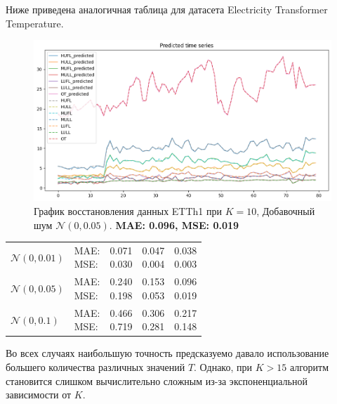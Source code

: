 \documentclass{article}
\begin{document}
Ниже приведена аналогичная таблица для датасета Electricity Transformer Temperature.

\begin{figure}[H]
	\centering
	\includegraphics[width=\textwidth]{K10N005_electicity.png}
	\caption{График восстановления данных ETTh1 при $K=10$, Добавочный шум $\mathcal{N}(0, 0.05)$. \textbf{MAE: 0.096, MSE: 0.019}}
	\label{fig:fig7}
\end{figure}

\def\arraystretch{2.3}
\begin{tabular}{|l||l||*{3}{c|}}\hline
	\backslashbox{Шум}{Параметры}
	&\makebox[3em]{Метрика}&\makebox[3em]{$K=2$}&\makebox[3em]{$K=4$}&\makebox[3em]{$K=10$}\\\hline
	$\mathcal{N}(0, 0.01)$&\makecell{ MAE: \\ MSE: } &\makecell{ 0.071 \\ 0.030 }&\makecell{ 0.047 \\ 0.004 }&\makecell{ 0.038 \\ 0.003 }\\\hline
	$\mathcal{N}(0, 0.05)$&\makecell{ MAE: \\ MSE: } &\makecell{ 0.240 \\ 0.198 }&\makecell{ 0.153 \\ 0.053 }&\makecell{ 0.096 \\ 0.019 }\\\hline
	$\mathcal{N}(0, 0.1)$& \makecell{ MAE: \\ MSE: } &\makecell{ 0.466 \\ 0.719 }&\makecell{ 0.306 \\ 0.281 }&\makecell{ 0.217 \\ 0.148 }\\\hline
\end{tabular}


Во всех случаях наибольшую точность предсказуемо давало использование большего количества различных значений $T$. Однако, при $K > 15$ алгоритм становится слишком вычислительно сложным из-за экспоненциальной зависимости от $K$.
\end{document}
